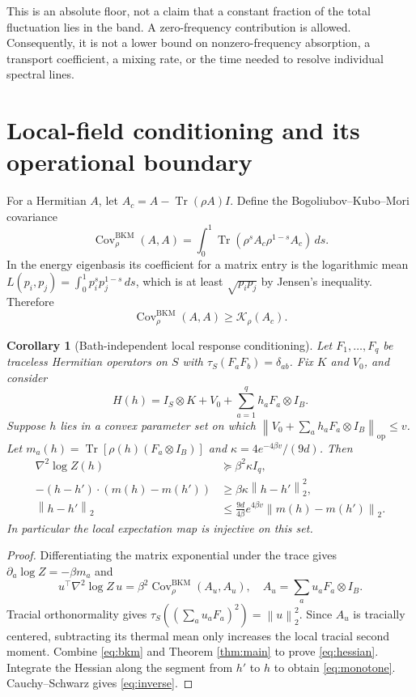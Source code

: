 \documentclass[11pt]{article}
\newtheorem{corollary}[theorem]{Corollary}
\theoremstyle{remark}\newtheorem{remark}[theorem]{Remark}
\newcommand{\Tr}{\operatorname{Tr}}
\newcommand{\op}{\mathrm{op}}
\newcommand{\BKM}{\mathrm{BKM}}
\newcommand{\norm}[1]{\left\lVert #1\right\rVert}
\newcommand{\tauS}{\tau_S}
\begin{document}
This is an absolute floor, not a claim that a constant fraction of the total fluctuation lies in the band. A zero-frequency contribution is allowed. Consequently, it is not a lower bound on nonzero-frequency absorption, a transport coefficient, a mixing rate, or the time needed to resolve individual spectral lines.

\section{Local-field conditioning and its operational boundary}
For a Hermitian $A$, let $A_c=A-\Tr(\rho A)I$. Define the Bogoliubov--Kubo--Mori covariance
\[
 \operatorname{Cov}^{\BKM}_\rho(A,A)=
 \int_0^1\Tr(\rho^s A_c\rho^{1-s}A_c)\,ds.
\]
In the energy eigenbasis its coefficient for a matrix entry is the logarithmic mean
$L(p_i,p_j)=\int_0^1p_i^s p_j^{1-s}\,ds$, which is at least $\sqrt{p_i p_j}$ by Jensen's inequality. Therefore
\begin{equation}\label{eq:bkm}
 \operatorname{Cov}^{\BKM}_\rho(A,A)\geq\mathcal K_\rho(A_c).
\end{equation}

\begin{corollary}[Bath-independent local response conditioning]\label{cor:inverse}
Let $F_1,\ldots,F_q$ be traceless Hermitian operators on $S$ with $\tauS(F_aF_b)=\delta_{ab}$. Fix $K$ and $V_0$, and consider
\[
 H(h)=I_S\otimes K+V_0+\sum_{a=1}^q h_a F_a\otimes I_B.
\]
Suppose $h$ lies in a convex parameter set on which
$\norm{V_0+\sum_a h_aF_a\otimes I_B}_\op\leq v$.
Let $m_a(h)=\Tr[\rho(h)(F_a\otimes I_B)]$ and
$\kappa=4e^{-4\beta v}/(9d)$. Then
\begin{align}
 \nabla^2\log Z(h)&\succeq\beta^2\kappa I_q,\label{eq:hessian}\\
 -(h-h')\cdot(m(h)-m(h'))&\geq\beta\kappa\norm{h-h'}_2^2,\label{eq:monotone}\\
 \norm{h-h'}_2&\leq\frac{9d}{4\beta}e^{4\beta v}\norm{m(h)-m(h')}_2.\label{eq:inverse}
\end{align}
In particular the local expectation map is injective on this set.
\end{corollary}
\begin{proof}
Differentiating the matrix exponential under the trace gives
$\partial_a\log Z=-\beta m_a$ and
\[
 u^\top\nabla^2\log Z\,u=
 \beta^2\operatorname{Cov}^{\BKM}_\rho(A_u,A_u),
 \quad A_u=\sum_a u_aF_a\otimes I_B.
\]
Tracial orthonormality gives $\tauS((\sum_a u_aF_a)^2)=\norm u_2^2$.
Since $A_u$ is tracially centered, subtracting its thermal mean only increases the local tracial second moment. Combine \eqref{eq:bkm} and Theorem \ref{thm:main} to prove \eqref{eq:hessian}. Integrate the Hessian along the segment from $h'$ to $h$ to obtain \eqref{eq:monotone}. Cauchy--Schwarz gives \eqref{eq:inverse}.
\end{proof}
\end{document}
